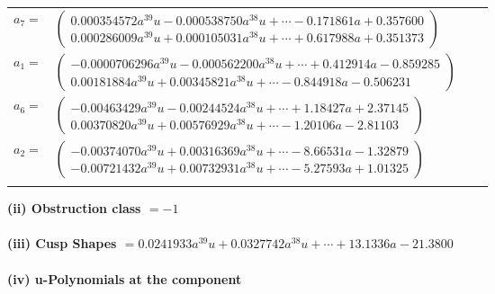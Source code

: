 \documentclass[1p]{elsarticle_modified}
\theoremstyle{definition}
\begin{document}
\begin{tabular}{m{7pt} m{180pt} m{7pt} m{180pt} }
\flushright $a_{7}=$&$\begin{pmatrix}0.000354572 a^{39} u-0.000538750 a^{38} u+\cdots-0.171861 a+0.357600\\0.000286009 a^{39} u+0.000105031 a^{38} u+\cdots+0.617988 a+0.351373\end{pmatrix}$ \\
\flushright $a_{1}=$&$\begin{pmatrix}-0.0000706296 a^{39} u-0.000562200 a^{38} u+\cdots+0.412914 a-0.859285\\0.00181884 a^{39} u+0.00345821 a^{38} u+\cdots-0.844918 a-0.506231\end{pmatrix}$ \\
\flushright $a_{6}=$&$\begin{pmatrix}-0.00463429 a^{39} u-0.00244524 a^{38} u+\cdots+1.18427 a+2.37145\\0.00370820 a^{39} u+0.00576929 a^{38} u+\cdots-1.20106 a-2.81103\end{pmatrix}$ \\
\flushright $a_{2}=$&$\begin{pmatrix}-0.00374070 a^{39} u+0.00316369 a^{38} u+\cdots-8.66531 a-1.32879\\-0.00721432 a^{39} u+0.00732931 a^{38} u+\cdots-5.27593 a+1.01325\end{pmatrix}$\\&\end{tabular}
\flushleft \textbf{(ii) Obstruction class $= -1$}\\~\\
\flushleft \textbf{(iii) Cusp Shapes $= 0.0241933 a^{39} u+0.0327742 a^{38} u+\cdots+13.1336 a-21.3800$}\\~\\
\newpage\renewcommand{\arraystretch}{1}
\flushleft \textbf{(iv) u-Polynomials at the component}\newline \\
\end{document}
